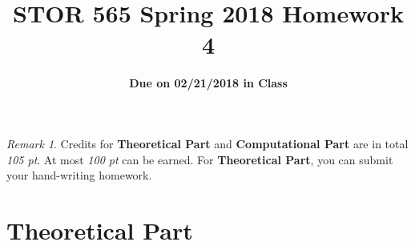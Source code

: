 \documentclass[10pt]{article}
\title{\textbf {STOR 565 Spring 2018 Homework 4}}
\subtitle{\textbf{Due on 02/21/2018 in Class}}
\author{}
\date{}
\theoremstyle{definition}
\theoremstyle{remark}
\newtheorem*{rmk}{Remark}
\begin{document}
\maketitle


\begin{rmk}
	Credits for \textbf{Theoretical Part} and \textbf{Computational Part} are in total \textit{105 pt}. At most \textit{100 pt} can be earned. For \textbf{Theoretical Part}, you can submit your hand-writing homework.
\end{rmk}

\section*{Theoretical Part}
\end{document}
